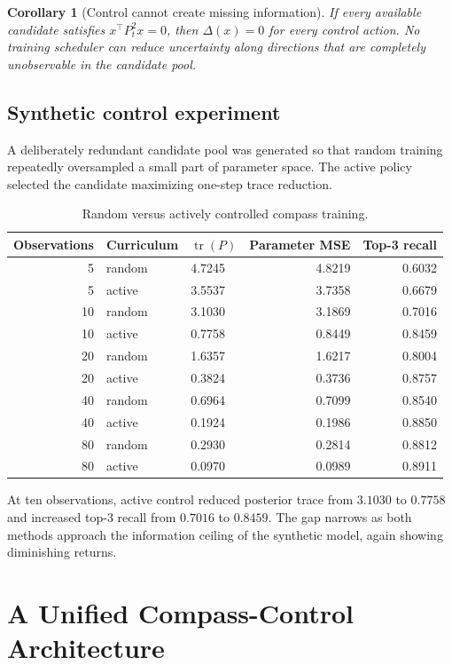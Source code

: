 \documentclass[11pt]{article}
\newtheorem{corollary}[theorem]{Corollary}
\begin{document}
\begin{corollary}[Control cannot create missing information]
If every available candidate satisfies \(x^\top P_t^2x=0\), then \(\Delta(x)=0\) for every control action. No training scheduler can reduce uncertainty along directions that are completely unobservable in the candidate pool.
\end{corollary}

\subsection{Synthetic control experiment}

A deliberately redundant candidate pool was generated so that random training repeatedly oversampled a small part of parameter space. The active policy selected the candidate maximizing one-step trace reduction.

\begin{table}[ht]
\centering
\caption{Random versus actively controlled compass training.}
\begin{tabular}{rllrr}
\toprule
Observations & Curriculum & \(\operatorname{tr}(P)\) & Parameter MSE & Top-3 recall\\
\midrule
5  & random & 4.7245 & 4.8219 & 0.6032\\
5  & active & 3.5537 & 3.7358 & 0.6679\\
10 & random & 3.1030 & 3.1869 & 0.7016\\
10 & active & 0.7758 & 0.8449 & 0.8459\\
20 & random & 1.6357 & 1.6217 & 0.8004\\
20 & active & 0.3824 & 0.3736 & 0.8757\\
40 & random & 0.6964 & 0.7099 & 0.8540\\
40 & active & 0.1924 & 0.1986 & 0.8850\\
80 & random & 0.2930 & 0.2814 & 0.8812\\
80 & active & 0.0970 & 0.0989 & 0.8911\\
\bottomrule
\end{tabular}
\end{table}

At ten observations, active control reduced posterior trace from \(3.1030\) to \(0.7758\) and increased top-3 recall from \(0.7016\) to \(0.8459\). The gap narrows as both methods approach the information ceiling of the synthetic model, again showing diminishing returns.

\section{A Unified Compass-Control Architecture}
\end{document}
